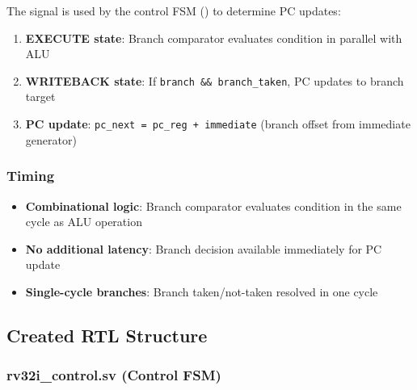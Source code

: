 \begin{record}

The  signal is used by the control FSM
() to determine PC updates:

\begin{enumerate}
\def\labelenumi{\arabic{enumi}.}
\tightlist
\item
  \textbf{EXECUTE state}: Branch comparator evaluates condition in
  parallel with ALU
\item
  \textbf{WRITEBACK state}: If
  \texttt{branch\ \&\&\ branch\_\allowbreak{}taken}, PC updates to
  branch target
\item
  \textbf{PC update}:
  \texttt{pc\_\allowbreak{}next\ =\allowbreak{}\ pc\_\allowbreak{}reg\ +\allowbreak{}\ immediate}
  (branch offset from immediate generator)
\end{enumerate}

\end{record}

\subsubsection{Timing}\label{cr:fix:cpu-integration-summary:timing}

\begin{record}

\begin{itemize}
\tightlist
\item
  \textbf{Combinational logic}: Branch comparator evaluates condition in
  the same cycle as ALU operation
\item
  \textbf{No additional latency}: Branch decision available immediately
  for PC update
\item
  \textbf{Single-cycle branches}: Branch taken/\allowbreak{}not-taken
  resolved in one cycle
\end{itemize}

\end{record}

\subsection{Created RTL Structure}\label{cr:fix:cpu-integration-summary:created-rtl-structure}

\subsubsection{\texorpdfstring{rv32i\_\allowbreak{}control.sv (Control
FSM)}{rv32i\_control.sv (Control FSM)}}\label{cr:fix:cpu-integration-summary:rv32i-controlsv-control-fsm}

